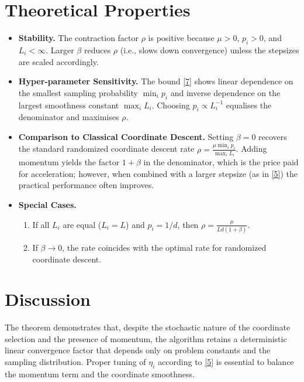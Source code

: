 \documentclass{article}
\begin{document}
\section*{Theoretical Properties}
\begin{itemize}
\item \textbf{Stability.} The contraction factor $\rho$ is positive because $\mu>0$, $p_i>0$, and $L_i<\infty$. Larger $\beta$ reduces $\rho$ (i.e., slows down convergence) unless the stepsizes are scaled accordingly.
\item \textbf{Hyper‑parameter Sensitivity.} The bound \eqref{7} shows linear dependence on the smallest sampling probability $\min_i p_i$ and inverse dependence on the largest smoothness constant $\max_i L_i$. Choosing $p_i\propto L_i^{-1}$ equalises the denominator and maximises $\rho$.
\item \textbf{Comparison to Classical Coordinate Descent.} Setting $\beta=0$ recovers the standard randomized coordinate descent rate 
$\rho = \frac{\mu\min_i p_i}{\max_i L_i}$.
Adding momentum yields the factor $1+\beta$ in the denominator, which is the price paid for acceleration; however, when combined with a larger stepsize (as in \eqref{5}) the practical performance often improves.
\item \textbf{Special Cases.}
\begin{enumerate}
\item If all $L_i$ are equal ($L_i=L$) and $p_i=1/d$, then $\rho=\frac{\mu}{L d (1+\beta)}$.
\item If $\beta\to0$, the rate coincides with the optimal rate for randomized coordinate descent.
\end{enumerate}
\end{itemize}

\section*{Discussion}
The theorem demonstrates that, despite the stochastic nature of the coordinate selection and the presence of momentum, the algorithm retains a deterministic linear convergence factor that depends only on problem constants and the sampling distribution. Proper tuning of $\eta_i$ according to \eqref{5} is essential to balance the momentum term and the coordinate smoothness.

\newpage
\end{document}
